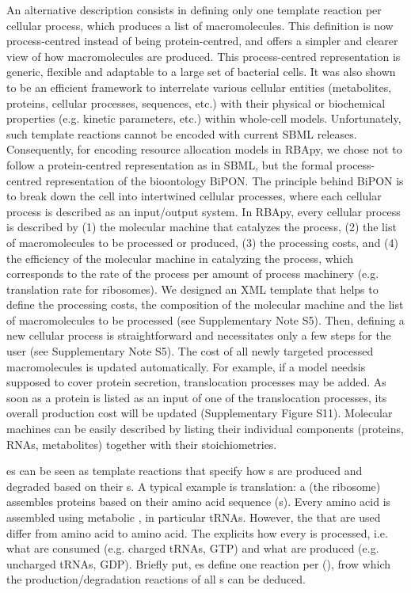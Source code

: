 An alternative description consists in defining only one template reaction per cellular process,
which produces a list of macromolecules.
This definition is now process-centred instead of being protein-centred,
and offers a simpler and clearer view of how macromolecules are produced.
This process-centred representation is generic,
flexible and adaptable to a large set of bacterial cells.
It was also shown to be an efficient framework to interrelate various cellular entities
(metabolites, proteins, cellular processes, sequences, etc.)
with their physical or biochemical properties (e.g. kinetic parameters, etc.)
within whole-cell models.
Unfortunately, such template reactions cannot be encoded with current SBML releases.
Consequently, for encoding resource allocation models in RBApy,
we chose not to follow a protein-centred representation as in SBML,
but the formal process-centred representation of the bioontology BiPON.
The principle behind BiPON is to break down the cell into intertwined cellular processes,
where each cellular process is described as an input/output system.
In RBApy, every cellular process is described by (1) the molecular machine that
catalyzes the process, (2) the list of macromolecules to be processed or produced,
(3) the processing costs, and (4) the efficiency of the molecular machine in catalyzing the process,
which corresponds to the rate of the process per amount of process machinery
(e.g. translation rate for ribosomes).
We designed an XML template that helps to define the processing costs,
the composition of the molecular machine and the list of macromolecules to be processed
(see Supplementary Note S5).
Then, defining a new cellular process is straightforward and necessitates
only a few steps for the user (see Supplementary Note S5).
The cost of all newly targeted processed macromolecules is updated automatically.
For example, if a model needsis supposed to cover protein secretion,
translocation processes may be added.
As soon as a protein is listed as an input of one of the translocation processes,
its overall production cost will be updated (Supplementary Figure S11).
Molecular machines can be easily described by listing their individual components
(proteins, RNAs, metabolites) together with their stoichiometries.


\process{}es can be seen as template reactions that specify how
\macromolecule{}s are produced and degraded based on their \component{}s.
A typical example is translation: a \machinery{} (the ribosome) assembles
proteins based on their amino acid sequence (\component{}s).
Every amino acid is assembled using metabolic \species, in particular tRNAs.
However, the \species{} that are used differ from amino acid to amino acid.
The \processingmap{} explicits how every \component{} is processed, i.e.
what \species{} are consumed (e.g. charged tRNAs, GTP) and what \species{} are
produced (e.g. uncharged tRNAs, GDP).
Briefly put, \process{}es define one reaction per \component(), frow which
the production/degradation reactions of all \macromolecule{}s can be deduced.

